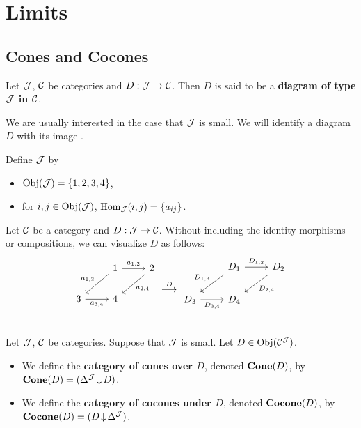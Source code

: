 \documentclass{book}
\begin{document}
	\newpage
	\chapter{Limits}
	
	\section{Cones and Cocones}
	
	\begin{defn} 
		Let $\mathcal{J}$, $\mathcal{C}$ be categories and $D: \mathcal{J} \rightarrow \mathcal{C}$. Then $D$ is said to be a \textbf{diagram of type $\mathcal{J}$ in $\mathcal{C}$}.
	\end{defn}
	
	\begin{note}
		We are usually interested in the case that $\mathcal{J}$ is small. We will identify a diagram $D$ with its image . 
	\end{note}
	
	\begin{exmp} 
		Define $\mathcal{J}$ by
		\begin{itemize}
			\item  $\operatorname{Obj}(\mathcal{J}) = \{1, 2, 3, 4\}$,
			\item for $i,j \in \operatorname{Obj}(\mathcal{J})$, $\operatorname{Hom}_{\mathcal{J}}(i,j) = \{a_{ij}\}$.
		\end{itemize}
		Let $\mathcal{C}$ be a category and $D: \mathcal{J} \rightarrow \mathcal{C}$. Without including the identity morphisms or compositions, we can visualize $D$  as follows:
		\[
		\begin{tikzcd}
			&     1  \arrow[dl, "a_{1,3}"'] \arrow[r, "a_{1,2}"]        &  2 \arrow[dl, "a_{2,4}"] \\
			3 \arrow[r, "a_{3,4}"'] &        4   & \\
		\end{tikzcd}
		\overset{D}{\longrightarrow}
		\begin{tikzcd}
			&     D_1  \arrow[dl, "D_{1,3}"'] \arrow[r, "D_{1,2}"]        &  D_2 \arrow[dl, "D_{2,4}"] \\
			D_3 \arrow[r, "D_{3, 4}"'] &        D_4   & \\
		\end{tikzcd}
		\]
	\end{exmp}
	
	\begin{defn} 
		Let $\mathcal{J}$, $\mathcal{C}$ be categories. Suppose that $\mathcal{J}$ is small. Let $D \in \operatorname{Obj}(\mathcal{C}^{\mathcal{J}})$. 
		\begin{itemize}
			\item We define the \textbf{category of cones over $D$}, denoted $\operatorname*{\text{\textbf{Cone}}}(D)$, by $\operatorname*{\text{\textbf{Cone}}}(D) = (\Delta^{\mathcal{J}} \operatorname{\downarrow} D)$.
			\item We define the \textbf{category of cocones under $D$}, denoted $\operatorname*{\text{\textbf{Cocone}}}(D)$, by $\operatorname*{\text{\textbf{Cocone}}}(D) = (D \operatorname{\downarrow} \Delta^{\mathcal{J}})$.
		\end{itemize}
	\end{defn}
	
\end{document}
